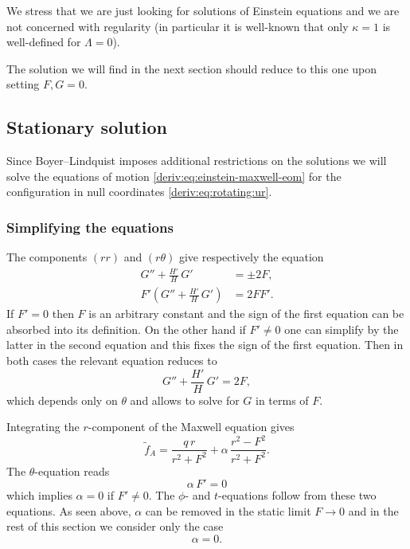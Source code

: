 We stress that we are just looking for solutions of Einstein equations and we are not concerned with regularity (in particular it is well-known that only $\kappa = 1$ is well-defined for $\Lambda = 0$).

The solution we will find in the next section should reduce to this one upon setting $F, G = 0$.


\subsection{Stationary solution}


Since Boyer--Lindquist imposes additional restrictions on the solutions we will solve the equations of motion \eqref{deriv:eq:einstein-maxwell-eom} for the configuration in null coordinates \eqref{deriv:eq:rotating:ur}.


\subsubsection{Simplifying the equations}
\label{sec:derivation:stationary:simplifying}


The components $(rr)$ and $(r\theta)$ give respectively the equation
\begin{subequations}
\begin{align}
	G'' + \frac{H'}{H}\, G' &= \pm 2 F, \\
	F' \left( G'' + \frac{H'}{H}\, G' \right) &= 2 F F'.
\end{align}
\end{subequations}
If $F' = 0$ then $F$ is an arbitrary constant and the sign of the first equation can be absorbed into its definition.\footnotemark{}%
On the other hand if $F' \neq 0$ one can simplify by the latter in the second equation and this fixes the sign of the first equation.
Then in both cases the relevant equation reduces to
\begin{equation}
	\label{eq:topdown-1-F-Gd-bis}
	G'' + \frac{H'}{H}\, G' = 2 F,
\end{equation} 
which depends only on $\theta$ and allows to solve for $G$ in terms of $F$.

Integrating the $r$-component of the Maxwell equation gives
\begin{equation}
	\tilde f_A = \frac{q\, r}{r^2 + F^2} + \alpha\, \frac{r^2 - F^2}{r^2 + F^2}.
\end{equation}
The $\theta$-equation reads
\begin{equation}
	\alpha\, F' = 0
\end{equation}
which implies $\alpha = 0$ if $F' \neq 0$.
The $\phi$- and $t$-equations follow from these two equations.
As seen above, $\alpha$ can be removed in the static limit $F \to 0$ and in the rest of this section we consider only the case\footnotemark{}%
\begin{equation}
	\alpha = 0.
\end{equation} 

